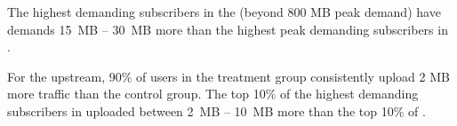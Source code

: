 The highest demanding subscribers in the \treatment{} (beyond 800 MB peak demand)
have demands 15~MB -- 30~MB more than the highest peak demanding subscribers
in \control{}.

For the upstream, 90\% of users in the treatment group consistently upload 2 MB
more traffic than the control group. The top 10\% of the highest demanding subscribers
in \treatment{} uploaded between 2~MB -- 10~MB more than the top 10\% of \control{}.



